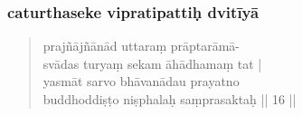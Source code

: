 \documentclass[12pt]{article}
\begin{document}
% 
 
\subsubsection{caturthaseke vipratipattiḥ dvitīyā}
\begin{quote}
	prajñājñānād uttaraṃ prāptarāmā-\\
	svādas turyaṃ sekam āhādhamaṃ tat |\\
	yasmāt sarvo bhāvanādau prayatno \\
	buddhoddiṣṭo niṣphalaḥ saṃprasaktaḥ || 16 ||

% 
\end{quote}
\end{document}
